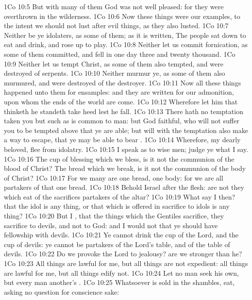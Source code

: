 \vs 1Co 10:5 But with many of them God was not well pleased: for they were overthrown in the wilderness.
\vs 1Co 10:6 Now these things were our examples, to the intent we should not lust after evil things, as they also lusted.
\vs 1Co 10:7 Neither be ye idolaters, as  some of them; as it is written, The people sat down to eat and drink, and rose up to play.
\vs 1Co 10:8 Neither let us commit fornication, as some of them committed, and fell in one day three and twenty thousand.
\vs 1Co 10:9 Neither let us tempt Christ, as some of them also tempted, and were destroyed of serpents.
\vs 1Co 10:10 Neither murmur ye, as some of them also murmured, and were destroyed of the destroyer.
\vs 1Co 10:11 Now all these things happened unto them for ensamples: and they are written for our admonition, upon whom the ends of the world are come.
\vs 1Co 10:12 Wherefore let him that thinketh he standeth take heed lest he fall.
\vs 1Co 10:13 There hath no temptation taken you but such as is common to man: but God  faithful, who will not suffer you to be tempted above that ye are able; but will with the temptation also make a way to escape, that ye may be able to bear .
\vs 1Co 10:14 Wherefore, my dearly beloved, flee from idolatry.
\vs 1Co 10:15 I speak as to wise men; judge ye what I say.
\vs 1Co 10:16 The cup of blessing which we bless, is it not the communion of the blood of Christ? The bread which we break, is it not the communion of the body of Christ?
\vs 1Co 10:17 For we  many are one bread,  one body: for we are all partakers of that one bread.
\vs 1Co 10:18 Behold Israel after the flesh: are not they which eat of the sacrifices partakers of the altar?
\vs 1Co 10:19 What say I then? that the idol is any thing, or that which is offered in sacrifice to idols is any thing?
\vs 1Co 10:20 But I , that the things which the Gentiles sacrifice, they sacrifice to devils, and not to God: and I would not that ye should have fellowship with devils.
\vs 1Co 10:21 Ye cannot drink the cup of the Lord, and the cup of devils: ye cannot be partakers of the Lord's table, and of the table of devils.
\vs 1Co 10:22 Do we provoke the Lord to jealousy? are we stronger than he?
\vs 1Co 10:23 All things are lawful for me, but all things are not expedient: all things are lawful for me, but all things edify not.
\vs 1Co 10:24 Let no man seek his own, but every man another's .
\vs 1Co 10:25 Whatsoever is sold in the shambles,  eat, asking no question for conscience sake:
